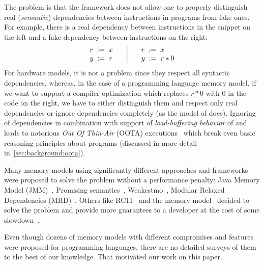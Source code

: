 The problem is that the framework does not
allow one to properly distinguish real (\emph{semantic}) dependencies between instructions in programs
from fake ones. For example, there is a real dependency between instructions in the snippet on the left
and a fake dependency between instructions on the right:
\[\begin{array}{l@{\qquad}|@{\qquad}l}
\readInst{}{r}{x} & \readInst{}{r}{x} \\
\writeInst{}{y}{r} & \readInst{}{y}{r * 0} \\
\end{array}\]
For hardware models, it is not a problem since they respect all syntactic dependencies,
whereas, in the case of a programming language memory model,
if we want to support a compiler optimization which replaces $r * 0$ with $0$ in the code on the right,
we have to either distinguish them and respect only real dependencies
or ignore dependencies completely (as the model of \CPP does).
Ignoring of dependencies in combination with support of \emph{load-buffering behavior} of \ARM and \POWER
leads to notorious \emph{Out Of Thin-Air} (OOTA) executions~\cite{Boehm-Demsky:MSPC14}
which break even basic reasoning principles about programs
(discussed in more detail in~\cref{sec:background:oota}).

Many memory models using significantly different approaches and frameworks were proposed to solve the problem
without a performance penalty:
Java Memory Model (JMM)~\cite{Manson-al:POPL05}, Promising semantics~\cite{Kang-al:POPL17,Lee-al:PLDI20},
Weakestmo~\cite{Chakraborty-Vafeiadis:POPL19}, Modular Relaxed Dependencies (MRD)~\cite{Paviotti-al:ESOP20}.
Others like RC11~\cite{Lahav-al:PLDI17} and the \OCaml memory model~\cite{Dolan-al:PLDI18} decided to solve
the problem and provide more guarantees to a developer at the cost of some slowdown~\cite{Ou-Demsky:OOPSLA18}.

Even though dozens of memory models with different compromises and features were proposed for programming languages,
there are no detailed surveys of them to the best of our knowledge. That motivated our work on this paper.



